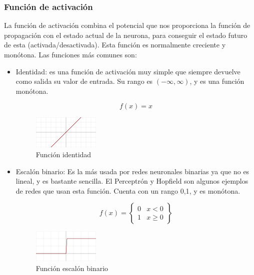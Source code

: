 \subsubsection {Función de activación} \label{def_funcion_activacion}
La función de activación combina el potencial que nos proporciona la función de propagación con el estado actual de la neurona, para conseguir el estado futuro de esta (activada/desactivada). Esta función es normalmente creciente y monótona. Las funciones más comunes son:
\begin{itemize}
\item Identidad: es una función de activación muy simple que siempre devuelve como salida su valor de entrada. Su rango es ${(-\infty,\infty)}$, y es una función monótona.\\
\begin{figure}[htp]
\centering
\begin{minipage}[b]{0.4\textwidth}
  \begin{equation}
  f(x) = x
  \end{equation}
  \end{minipage}
\hfill
\begin{minipage}[b]{0.4\textwidth}
  \includegraphics[scale=0.8]{images/Activation_identity.png}
  \caption{Función identidad}
  \end{minipage}
\end{figure}

\item Escalón binario: Es la más usada por redes neuronales binarias ya que no es lineal, y es bastante sencilla. El Perceptrón y Hopfield son algunos ejemplos de redes que usan esta función. Cuenta con un rango {0,1}, y es monótona.
\begin{figure}[htp]
\centering
\begin{minipage}[b]{0.4\textwidth}
  \begin{equation}
  f(x) = \begin{Bmatrix}
  0 & x<0\\
  1 & x\geq 0
  \end{Bmatrix}
  \end{equation}
  \end{minipage}
\hfill
\begin{minipage}[b]{0.4\textwidth}
  \includegraphics[scale=0.8]{images/Activation_binary_step.png}
  \caption{Función escalón binario}
\end{minipage}
\end{figure}


\end{itemize}
